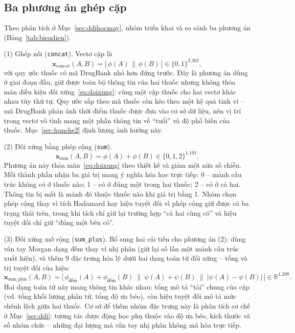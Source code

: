 \documentclass[12pt,a4paper,oneside]{report}
\begin{document}
\subsection{Ba phương án ghép cặp}
Theo phân tích ở Mục~\ref{sec:ddihocmay}, nhóm triển khai và so sánh ba phương
án (Bảng~\ref{tab:bieudien}).

(1) Ghép nối (\texttt{concat}). Vectơ cặp là
\begin{equation}
  \mathbf{x}_{\text{concat}}(A,B) = \big[\, \phi(A) \,\|\, \phi(B) \,\big]
  \in \{0,1\}^{2.382},
  \label{eq:concat}
\end{equation}
với quy ước thuốc có mã DrugBank nhỏ hơn đứng trước. Đây là phương án dùng ở
giai đoạn đầu, giữ được toàn bộ thông tin của hai thuốc nhưng không thỏa
mãn điều kiện đối xứng~\eqref{eq:doixung}: cùng một cặp thuốc cho hai vectơ khác
nhau tùy thứ tự. Quy ước sắp theo mã thuốc còn kéo theo một hệ quả tinh vi --
mã DrugBank phản ánh thời điểm thuốc được đưa vào cơ sở dữ liệu, nên vị trí
trong vectơ vô tình mang một phần thông tin về ``tuổi'' và độ phổ biến của
thuốc. Mục~\ref{sec:hanche2} định lượng ảnh hưởng này.

(2) Đối xứng bằng phép cộng (\texttt{sum}).
\begin{equation}
  \mathbf{x}_{\text{sum}}(A,B) = \phi(A) + \phi(B) \in \{0,1,2\}^{1.191} .
  \label{eq:sum}
\end{equation}
Phương án này thỏa mãn~\eqref{eq:doixung} theo thiết kế và giảm một nửa số
chiều. Mỗi thành phần nhận ba giá trị mang ý nghĩa hóa học trực tiếp: 0 -- mảnh
cấu trúc không có ở thuốc nào; 1 -- có ở đúng một trong hai thuốc; 2 --
có ở cả hai. Thông tin bị mất là mảnh đó thuộc thuốc nào khi giá
trị bằng 1. Nhóm chọn phép cộng thay vì tích Hadamard hay hiệu tuyệt đối vì
phép cộng giữ được cả ba trạng thái trên, trong khi tích chỉ giữ lại trường hợp
``cả hai cùng có'' và hiệu tuyệt đối chỉ giữ ``đúng một bên có''.

(3) Đối xứng mở rộng (\texttt{sum\_plus}). Bổ sung hai cải tiến cho
phương án (2): dùng vân tay Morgan dạng đếm thay vì nhị phân (giữ lại số
lần một mảnh cấu trúc xuất hiện), và thêm 9 đặc trưng hóa lý dưới hai dạng toán
tử đối xứng -- tổng và trị tuyệt đối của hiệu:
\begin{equation}
  \mathbf{x}_{\text{sum\_plus}}(A,B) = \Big[\,
  \phi_{\text{đếm}}(A) + \phi_{\text{đếm}}(B)
  \;\big\|\; \psi(A) + \psi(B)
  \;\big\|\; \big|\psi(A) - \psi(B)\big| \,\Big]
  \in \mathbb{R}^{1.209} .
  \label{eq:sumplus}
\end{equation}
Hai dạng toán tử này mang thông tin khác nhau: tổng mô tả ``tải'' chung
của cặp (vd. tổng khối lượng phân tử, tổng độ ưa béo), còn hiệu tuyệt đối
mô tả mức chênh lệch giữa hai thuốc. Cơ sở để thêm nhóm đặc trưng này là
phân tích cơ chế ở Mục~\ref{sec:ddi}: tương tác dược động học phụ thuộc vào độ
ưa béo, kích thước và số nhóm chức -- những đại lượng mà vân tay nhị phân không
mã hóa trực tiếp.
\end{document}
